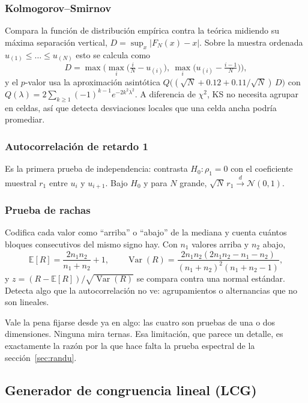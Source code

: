 \documentclass[11pt,letterpaper]{article}
\DeclareMathOperator{\Var}{Var}
\begin{document}
\subsubsection{Kolmogorov--Smirnov} Compara la función de distribución empírica
contra la teórica midiendo su máxima separación vertical,
$D = \sup_x |F_N(x) - x|$. Sobre la muestra ordenada
$u_{(1)} \le \dots \le u_{(N)}$ esto se calcula como
\begin{equation}
D = \max\Big(\max_i \big(\tfrac{i}{N} - u_{(i)}\big),\
             \max_i \big(u_{(i)} - \tfrac{i-1}{N}\big)\Big),
\end{equation}
y el $p$-valor usa la aproximación asintótica
$Q\big((\sqrt{N} + 0.12 + 0.11/\sqrt{N})\,D\big)$ con
$Q(\lambda) = 2\sum_{k\ge1} (-1)^{k-1} e^{-2k^2\lambda^2}$. A diferencia de
$\chi^2$, KS no necesita agrupar en celdas, así que detecta desviaciones
locales que una celda ancha podría promediar.

\subsubsection{Autocorrelación de retardo 1} Es la primera prueba de
independencia: contrasta $H_0: \rho_1 = 0$ con el coeficiente muestral $r_1$
entre $u_i$ y $u_{i+1}$. Bajo $H_0$ y para $N$ grande,
$\sqrt{N}\,r_1 \xrightarrow{d} \mathcal{N}(0,1)$.

\subsubsection{Prueba de rachas} Codifica cada valor como ``arriba'' o ``abajo''
de la mediana y cuenta cuántos bloques consecutivos del mismo signo hay. Con
$n_1$ valores arriba y $n_2$ abajo,
\begin{equation}
\mathbb{E}[R] = \frac{2n_1n_2}{n_1+n_2}+1, \qquad
\Var(R) = \frac{2n_1n_2(2n_1n_2-n_1-n_2)}{(n_1+n_2)^2(n_1+n_2-1)},
\end{equation}
y $z = (R - \mathbb{E}[R])/\sqrt{\Var(R)}$ se compara contra una normal
estándar. Detecta algo que la autocorrelación no ve: agrupamientos o
alternancias que no son lineales.

Vale la pena fijarse desde ya en algo: las cuatro son pruebas de una o dos
dimensiones. Ninguna mira ternas. Esa limitación, que parece un detalle, es
exactamente la razón por la que hace falta la prueba espectral de la
sección~\ref{sec:randu}.

\subsection{Generador de congruencia lineal (LCG)}
\end{document}
